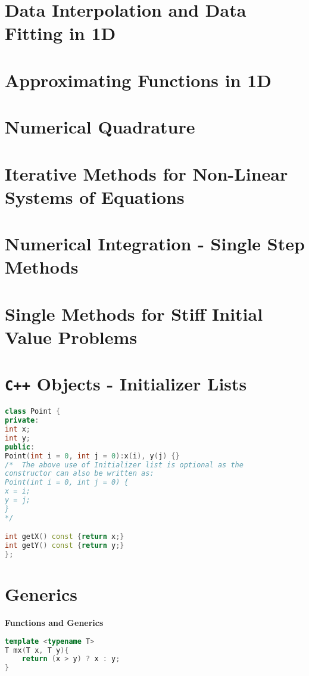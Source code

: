 \documentclass{sciposter}
\newcommand{\psection}[1]{\par \textbf{\large#1}}
\begin{document}
\begin{multicols}{2}
\section{Data Interpolation and Data Fitting in 1D}

\section{Approximating Functions in 1D}

\section{Numerical Quadrature}

\section{Iterative Methods for Non-Linear Systems of Equations}


\section{Numerical Integration - Single Step Methods}

\section{Single Methods for Stiff Initial Value Problems}


\section*{\texttt{C++} Objects - Initializer Lists}



\begin{lstlisting}[language=c++]
class Point { 
private: 
int x; 
int y; 
public: 
Point(int i = 0, int j = 0):x(i), y(j) {}  
/*  The above use of Initializer list is optional as the  
constructor can also be written as: 
Point(int i = 0, int j = 0) { 
x = i; 
y = j; 
} 
*/    

int getX() const {return x;} 
int getY() const {return y;} 
}; 
\end{lstlisting}

\section*{Generics}

\psection{Functions and Generics}
\begin{lstlisting}[language=c++]
template <typename T> 
T mx(T x, T y){ 
	return (x > y) ? x : y; 
} 


\end{lstlisting}
\end{multicols}
\end{document}
